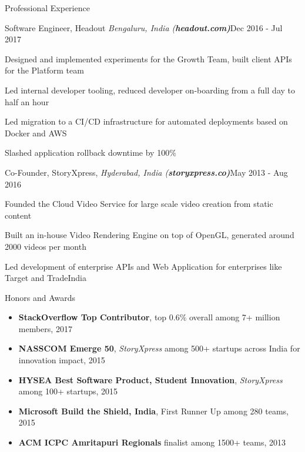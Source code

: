 \documentclass{resume}
\begin{document}
\begin{rSection}{Professional Experience}

\begin{rSubsection}{Software Engineer, Headout \it{Bengaluru, India} (\bf{headout.com})}{Dec 2016 - Jul 2017}{}{}
\item Designed and implemented experiments for the Growth Team, built client APIs for the Platform team
\item Led internal developer tooling, reduced developer on-boarding from a full day to half an hour
\item Led migration to a CI/CD infrastructure for automated deployments based on Docker and AWS
\item Slashed application rollback downtime by 100\%

\end{rSubsection}

\begin{rSubsection}{Co-Founder, StoryXpress, \it{Hyderabad, India} (\bf{storyxpress.co})}{May 2013 - Aug 2016}{}{}
\item Founded the Cloud Video Service for large scale video creation from static content
\item Built an in-house Video Rendering Engine on top of OpenGL, generated around 2000 videos per month
\item Led development of enterprise APIs and Web Application for enterprises like Target and TradeIndia

\end{rSubsection}

\end{rSection}

\begin{rSection}{Honors and Awards}
  \begin{itemize}[label={},topsep=0pt,itemsep=-0.5ex,partopsep=1ex,parsep=1ex,leftmargin=0.25em]
  \item  {\bf StackOverflow Top Contributor}, top 0.6\% overall among 7+ million members, 2017
  \item {\bf NASSCOM Emerge 50}, {\it StoryXpress} among 500+ startups across India for innovation impact, 2015
  \item {\bf HYSEA Best Software Product, Student Innovation}, {\it StoryXpress} among 100+ startups, 2015
  \item {\bf Microsoft Build the Shield, India}, First Runner Up among 280 teams, 2015
  \item {\bf ACM ICPC Amritapuri Regionals} finalist among 1500+ teams, 2013
  \end{itemize}
\end{rSection}
\end{document}
